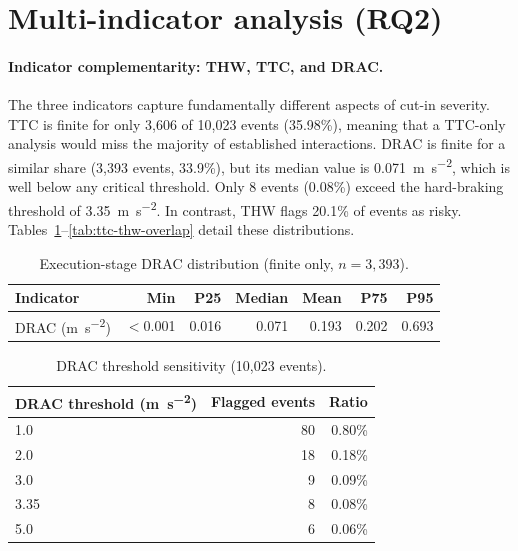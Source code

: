 \documentclass[12pt,a4paper,twoside,openright]{report}
\begin{document}
    \section{Multi-indicator analysis (RQ2)}
    \label{sec:drac-results}

    \paragraph{Indicator complementarity: THW, TTC, and DRAC.}
    The three indicators capture fundamentally different aspects of cut-in severity. TTC is finite for only 3,606 of 10,023 events (35.98\%), meaning that a TTC-only analysis would miss the majority of established interactions. DRAC is finite for a similar share (3,393 events, 33.9\%), but its median value is \SI{0.071}{\meter\per\second\squared}, which is well below any critical threshold. Only 8 events (0.08\%) exceed the hard-braking threshold of \SI{3.35}{\meter\per\second\squared}. In contrast, THW flags 20.1\% of events as risky. Tables~\ref{tab:drac-dist}--\ref{tab:ttc-thw-overlap} detail these distributions.

    \begin{table}[H]
        \centering
        \caption{Execution-stage DRAC distribution (finite only, $n=3{,}393$).}
        \label{tab:drac-dist}
        {\small
            \begin{tabular}{@{}lrrrrrr@{}}
                \toprule
                Indicator & Min & P25 & Median & Mean & P75 & P95 \\
                \midrule
                DRAC (\si{\meter\per\second\squared}) & $<$0.001 & 0.016 & 0.071 & 0.193 & 0.202 & 0.693 \\
                \bottomrule
            \end{tabular}}
    \end{table}

    \begin{table}[H]
        \centering
        \caption{DRAC threshold sensitivity (10,023 events).}
        \label{tab:drac-sensitivity}
        \begin{tabular}{@{}lrr@{}}
            \toprule
            DRAC threshold (\si{\meter\per\second\squared}) & Flagged events & Ratio \\
            \midrule
            1.0  &  80  &  0.80\% \\
            2.0  &  18  &  0.18\% \\
            3.0  &   9  &  0.09\% \\
            3.35 &   8  &  0.08\% \\
            5.0  &   6  &  0.06\% \\
            \bottomrule
        \end{tabular}
    \end{table}
\end{document}
